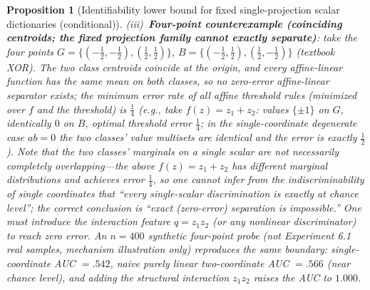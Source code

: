 \documentclass[11pt]{article}
\newtheorem{proposition}{Proposition}[section]
\numberwithin{equation}{section}
\begin{document}
\begin{proposition}[Identifiability lower bound for fixed single-projection scalar dictionaries (conditional)]
(iii)~\textbf{Four-point counterexample (coinciding centroids; the fixed projection family cannot exactly separate)}: take the four points $G=\{(-\tfrac12,-\tfrac12),(\tfrac12,\tfrac12)\}$, $B=\{(-\tfrac12,\tfrac12),(\tfrac12,-\tfrac12)\}$ (textbook XOR). The two class centroids coincide at the origin, and every affine-linear function has the same mean on both classes, so \emph{no zero-error affine-linear separator exists}; the minimum error rate of all affine threshold rules (minimized over $f$ and the threshold) is $\tfrac14$ (e.g., take $f(z)=z_1+z_2$: values $\{\pm1\}$ on $G$, identically $0$ on $B$, optimal threshold error $\tfrac14$; in the single-coordinate degenerate case $ab=0$ the two classes' value multisets are identical and the error is exactly $\tfrac12$). Note that the two classes' marginals on a single scalar \emph{are not necessarily} completely overlapping---the above $f(z)=z_1+z_2$ has different marginal distributions and achieves error $\tfrac14$, so one cannot infer from the indiscriminability of single coordinates that ``every single-scalar discrimination is exactly at chance level''; the correct conclusion is ``exact (zero-error) separation is impossible.'' One must introduce the interaction feature $q=z_1z_2$ (or any nonlinear discriminator) to reach zero error. An $n=400$ \emph{synthetic four-point probe} (not Experiment 6.1 real samples, mechanism illustration only) reproduces the same boundary: single-coordinate AUC $=.542$, naive \emph{purely linear} two-coordinate AUC $=.566$ (near chance level), and adding the structural interaction $z_1z_2$ raises the AUC to $1.000$.
\end{proposition}
\end{document}
